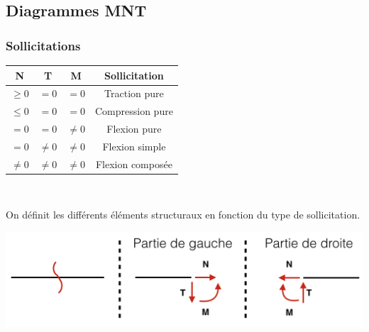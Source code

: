 	\subsection*{Diagrammes MNT}
		\subsubsection{Sollicitations}
		\begin{center}
		\begin{tabular}{|c|c|c|c|}
		\hline 
		N & T & M & Sollicitation \\ 
		\hline 
		$\geq 0$ & $=0$ & $= 0$ & Traction pure \\ 
		$\leq 0 $ & $=0$ & $=0$ & Compression pure \\ 
		$=0$ & $=0$ & $\neq 0$ & Flexion pure \\ 
		$=0$ & $\neq 0$ & $\neq 0$ & Flexion simple \\ 
		$\neq 0$ & $\neq 0$ & $\neq 0$ & Flexion composée \\ 
		\hline 
		\end{tabular} 
		\ \\
		\end{center}
		On définit les différents éléments structuraux en fonction du type de sollicitation. 
		\begin{center}
			\includegraphics[scale=0.5]{Rappels/1}
		\end{center}
